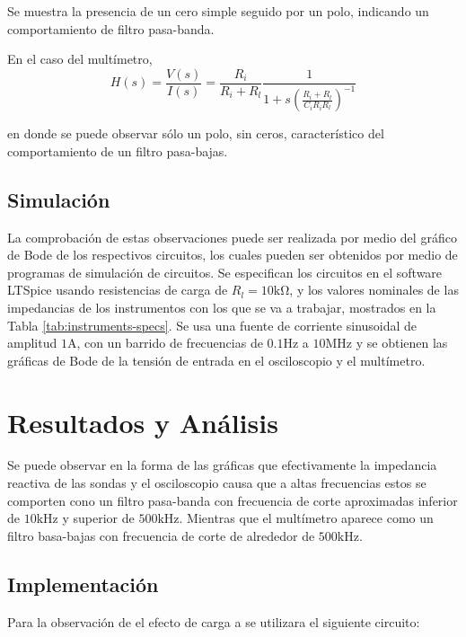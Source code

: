 Se muestra la presencia de un cero simple seguido por un polo, indicando
un comportamiento de filtro pasa-banda.



En el caso del multímetro, 
\[
    H(s) = \frac{V(s)}{I(s)} = \frac{R_i}{R_i + R_l} \frac{1}
        {1 + s\left(\frac{R_i + R_l}{C_i R_i R_l}\right)^{-1}}
\]

en donde se puede observar sólo un polo, sin ceros, característico del 
comportamiento de un filtro pasa-bajas. 

\subsection{Simulación}



La comprobación de estas observaciones
puede ser realizada por medio del gráfico de Bode de los respectivos circuitos,
los cuales pueden ser obtenidos por medio de programas de simulación de circuitos.
Se especifican los circuitos en el software LTSpice usando resistencias de carga
de $R_l = 10\si{\kilo\ohm}$, y los valores nominales de las impedancias
de los instrumentos con los que se va a trabajar, mostrados en la Tabla 
\ref{tab:instruments-specs}.
Se usa una fuente de corriente sinusoidal de amplitud $1\si{\ampere}$, con un
barrido de frecuencias de $0.1\si{\hertz}$ a $10\si{\mega\hertz}$ y se obtienen
las gráficas de Bode de la tensión de entrada en el osciloscopio y el multímetro.


\section{Resultados y Análisis}




Se puede observar en la forma de las gráficas que efectivamente
la impedancia reactiva de las sondas y el osciloscopio causa que a 
altas frecuencias estos se comporten cono un filtro pasa-banda con 
frecuencia de corte aproximadas inferior de $10\si{\kilo\hertz}$ y 
superior de $500\si{\kilo\hertz}$. Mientras que el multímetro aparece
como un filtro basa-bajas con frecuencia de corte de alrededor de
$500\si{\kilo\hertz}$.


\subsection{Implementación}
Para la observación de el efecto de carga a se utilizara el siguiente circuito:

